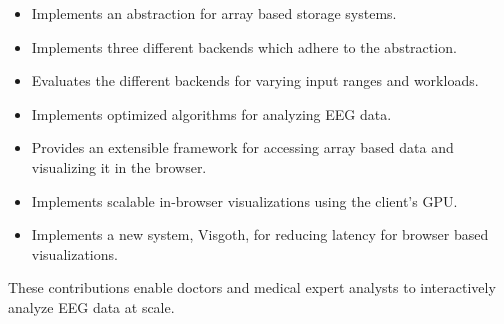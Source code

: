 \begin{itemize}

  \item Implements an abstraction for array based storage systems.

  \item Implements three different backends which adhere to the abstraction.

  \item Evaluates the different backends for varying input ranges and
    workloads.

  \item Implements optimized algorithms for analyzing EEG data.

  \item Provides an extensible framework for accessing array based data and
    visualizing it in the browser.

  \item Implements scalable in-browser visualizations using the client's GPU.

  \item Implements a new system, Visgoth, for reducing latency for browser
    based visualizations.

\end{itemize}

These contributions enable doctors and medical expert analysts to interactively
analyze EEG data at scale.

